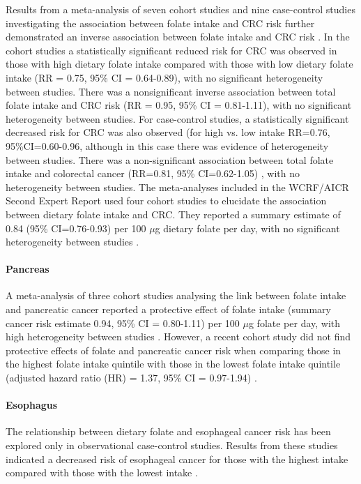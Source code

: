 \noindent Results from a meta-analysis of seven cohort studies and nine case-control studies investigating the association between folate intake and CRC risk further demonstrated an inverse association between folate intake and CRC risk \cite{c233}. In the cohort studies a statistically significant reduced risk for CRC was observed in those with high dietary folate intake compared with those with low dietary folate intake (RR = 0.75, 95\% CI = 0.64-0.89), with no significant heterogeneity between studies. There was a nonsignificant inverse association between total folate intake and CRC risk (RR = 0.95, 95\% CI = 0.81-1.11), with no significant heterogeneity between studies. For case-control studies, a statistically significant decreased risk for CRC was also observed (for high vs. low intake RR=0.76, 95\%CI=0.60-0.96, although in this case there was evidence of heterogeneity between studies. There was a non-significant association between total folate intake and colorectal cancer (RR=0.81, 95\% CI=0.62-1.05)
, with no heterogeneity between studies. The meta-analyses included in the WCRF/AICR Second Expert Report used four cohort studies to elucidate the association between dietary folate intake and CRC. They reported a summary estimate of 0.84 (95\% CI=0.76-0.93) per 100 $\mu$g dietary folate per day, with no significant heterogeneity between studies \cite{c214}. 
 
\paragraph{Pancreas} %
A meta-analysis of three cohort studies analysing the link between folate intake and pancreatic cancer reported a protective effect of folate intake (summary cancer risk estimate 0.94, 95\% CI = 0.80-1.11) per 100 $\mu$g folate per day, with high heterogeneity between studies \cite{c214}. However, a recent cohort study did not find protective effects of folate and pancreatic cancer risk when comparing those in the highest folate intake quintile with those in the lowest folate intake quintile (adjusted hazard ratio (HR) = 1.37, 95\% CI = 0.97-1.94) \cite{c234}. 
 
\paragraph{Esophagus} %
The relationship between dietary folate and esophageal cancer risk has been explored only in observational case-control studies. Results from these studies indicated a decreased risk of esophageal cancer for those with the highest intake compared with those with the lowest intake \cite{c214}. 
 
